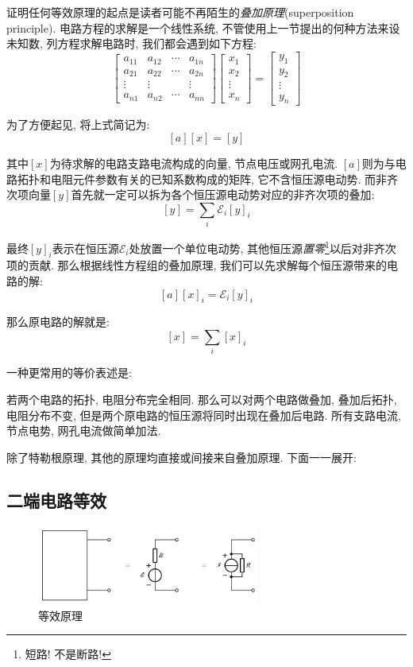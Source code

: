 证明任何等效原理的起点是读者可能不再陌生的\emph{叠加原理}(superposition principle). 电路方程的求解是一个线性系统, 不管使用上一节提出的何种方法来设未知数, 列方程求解电路时, 我们都会遇到如下方程:
\[\begin{bmatrix}
a_{11}  & a_{12} &\cdots& a_{1n} \\ 
a_{21}  & a_{22} &\cdots& a_{2n}\\
\vdots  & \vdots && \vdots\\
a_{n1}  & a_{n2} &\cdots& a_{nn} 
 \end{bmatrix}\begin{bmatrix}
x_1 \\ 
x_2\\
\vdots\\
x_n
  \end{bmatrix}=\begin{bmatrix}
y_1 \\ 
y_2\\
\vdots\\
y_n
  \end{bmatrix}
\]

为了方便起见, 将上式简记为:
\[[a][x]=[y]\]

其中$[x]$为待求解的电路支路电流构成的向量, 节点电压或网孔电流. $[a]$则为与电路拓扑和电阻元件参数有关的已知系数构成的矩阵, 它不含恒压源电动势. 而非齐次项向量$[y]$首先就一定可以拆为各个恒压源电动势对应的非齐次项的叠加:
\[[y]=\sum_i \mathscr{E}_i[y]_i\]

最终$[y]_i$表示在恒压源$\mathscr{E}_i$处放置一个单位电动势, 其他恒压源\emph{置零}\footnote{短路! 不是断路!}以后对非齐次项的贡献. 那么根据线性方程组的叠加原理, 我们可以先求解每个恒压源带来的电路的解:
\[[a][x]_i=\mathscr{E}_i[y]_i\]

那么原电路的解就是:
\[[x]=\sum_i[x]_i\]

一种更常用的等价表述是:

若两个电路的拓扑, 电阻分布完全相同. 那么可以对两个电路做叠加, 叠加后拓扑, 电阻分布不变, 但是两个原电路的恒压源将同时出现在叠加后电路. 所有支路电流, 节点电势, 网孔电流做简单加法.

除了特勒根原理, 其他的原理均直接或间接来自叠加原理. 下面一一展开:

\subsection{二端电路等效}


\begin{figure}[H]
\centering
\includegraphics[width=0.65\textwidth]{image/7-3-19.png}
\caption{等效原理}
\end{figure}

